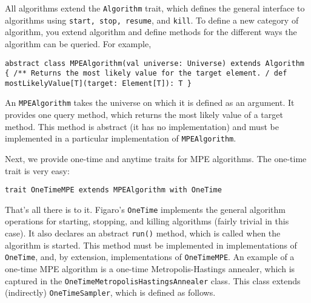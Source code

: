All algorithms extend the \texttt{Algorithm} trait, which defines the general interface to algorithms using \texttt{start, stop,  resume}, and \texttt{kill}. To define a new category of algorithm, you extend algorithm and define methods for the different ways the algorithm can be queried. For example,


\begin{flushleft}
\texttt{abstract class MPEAlgorithm(val universe: Universe)
\newline extends Algorithm \{
\newline \tab /** 
\newline \tab * Returns the most likely value for the target element.
\newline \tab */
\newline \tab def mostLikelyValue[T](target: Element[T]): T
\newline \}
}
\end{flushleft}

An \texttt{MPEAlgorithm} takes the universe on which it is defined as an argument. It provides one query method, which returns the most likely value of a target method. This method is abstract (it has no implementation) and must be implemented in a particular implementation of  \texttt{MPEAlgorithm}.

Next, we provide one-time and anytime traits for MPE algorithms. The one-time trait is very easy:

\begin{flushleft}
\texttt{trait OneTimeMPE extends MPEAlgorithm with OneTime}
\end{flushleft}

That's all there is to it. Figaro's \texttt{OneTime} implements the general algorithm operations for starting, stopping, and killing algorithms (fairly trivial in this case). It also declares an abstract \texttt{run()} method, which is called when the algorithm is started. This method must be implemented in implementations of \texttt{OneTime}, and, by extension, implementations of \texttt{OneTimeMPE}. An example of a one-time MPE algorithm is a one-time Metropolis-Hastings annealer, which is captured in the \texttt{OneTimeMetropolisHastingsAnnealer} class. This class extends (indirectly) \texttt{OneTimeSampler}, which is defined as follows.

